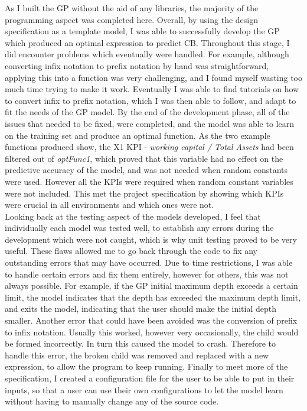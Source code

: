 \documentclass[11pt]{article}
\begin{document}
As I built the GP without the aid of any libraries, the majority of the programming aspect was completed here. Overall, by using the design specification as a template model, I was able to successfully develop the GP which produced an optimal expression to predict CB. Throughout this stage, I did encounter problems which eventually were handled. For example, although converting infix notation to prefix notation by hand was straightforward, applying this into a function was very challenging, and I found myself wasting too much time trying to make it work. Eventually I was able to find tutorials on how to convert infix to prefix notation, which I was then able to follow, and adapt to fit the needs of the GP model. By the end of the development phase, all of the issues that needed to be fixed, were completed, and the model was able to learn on the training set and produce an optimal function. As the two example functions produced show, the X1 KPI - \textit{working capital / Total Assets} had been filtered out of \textit{optFunc1}, which proved that this variable had no effect on the predictive accuracy of the model, and was not needed when random constants were used. However all the KPIs were required when random constant variables were not included. This met the project specification by showing which KPIs were crucial in all environments and which ones were not.\\

Looking back at the testing aspect of the models developed, I feel that individually each model was tested well, to establish any errors during the development which were not caught, which is why unit testing proved to be very useful. These flaws allowed me to go back through the code to fix any outstanding errors that may have occurred. Due to time restrictions, I was able to handle certain errors and fix them entirely, however for others, this was not always  possible. For example, if the GP initial maximum depth exceeds a certain limit, the model indicates that the depth has exceeded the maximum depth limit, and exits the model, indicating that the user should make the initial depth smaller. Another error that could have been avoided was the conversion of prefix to infix notation. Usually this worked, however very occasionally, the child would be formed incorrectly. In turn this caused the model to crash. Therefore to handle this error, the broken child was removed and replaced with a new expression, to allow the program to keep running. Finally to meet more of the specification, I created a configuration file for the user to be able to put in their inputs, so that a user can use their own configurations to let the model learn without having to manually change any of the source code. 
\end{document}
